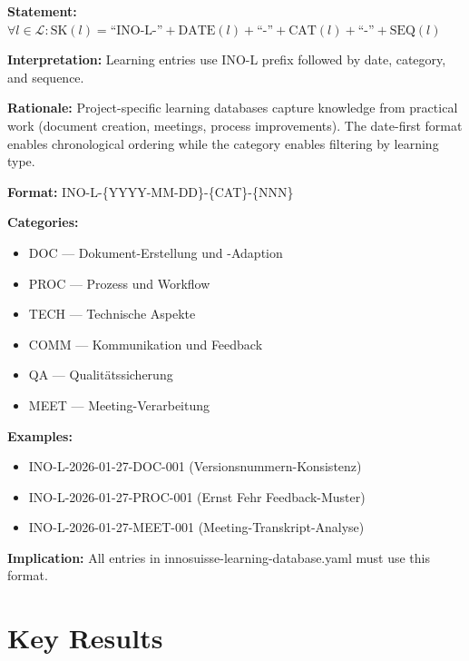 \begin{tcolorbox}[colback=gray!5!white, colframe=gray!75!black,
    title=Axiom SK-10: Learning Database Keys]
\textbf{Statement:} $\forall l \in \mathcal{L}: \text{SK}(l) = \text{``INO-L-''} + \text{DATE}(l) + \text{``-''} + \text{CAT}(l) + \text{``-''} + \text{SEQ}(l)$

\textbf{Interpretation:} Learning entries use INO-L prefix followed by date, category, and sequence.

\textbf{Rationale:} Project-specific learning databases capture knowledge from practical work
(document creation, meetings, process improvements). The date-first format enables chronological
ordering while the category enables filtering by learning type.

\textbf{Format:} INO-L-\{YYYY-MM-DD\}-\{CAT\}-\{NNN\}

\textbf{Categories:}
\begin{itemize}[nosep]
\item DOC --- Dokument-Erstellung und -Adaption
\item PROC --- Prozess und Workflow
\item TECH --- Technische Aspekte
\item COMM --- Kommunikation und Feedback
\item QA --- Qualitätssicherung
\item MEET --- Meeting-Verarbeitung
\end{itemize}

\textbf{Examples:}
\begin{itemize}[nosep]
\item INO-L-2026-01-27-DOC-001 (Versionsnummern-Konsistenz)
\item INO-L-2026-01-27-PROC-001 (Ernst Fehr Feedback-Muster)
\item INO-L-2026-01-27-MEET-001 (Meeting-Transkript-Analyse)
\end{itemize}

\textbf{Implication:} All entries in innosuisse-learning-database.yaml must use this format.
\end{tcolorbox}


\section{Key Results}
\label{sec:superkey-results}


